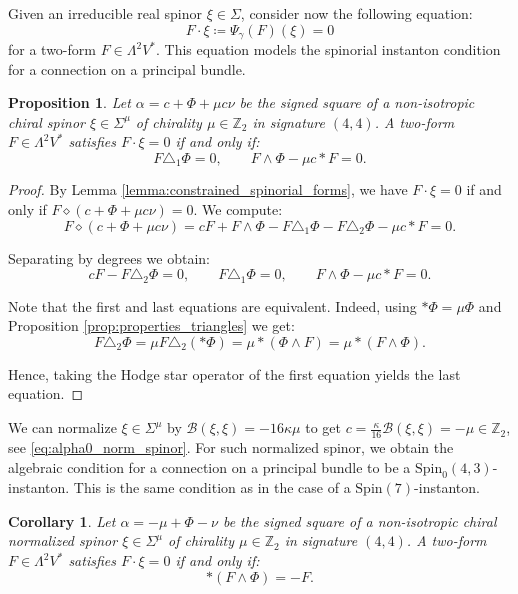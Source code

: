 \documentclass[10pt,reqno]{amsart}
\newtheorem{proposition}[theorem]{Proposition}
\newtheorem{corollary}[theorem]{Corollary}
\theoremstyle{definition}
\theoremstyle{remark}
\newcommand{\Z}{\mathbb{Z}}
\begin{document}
Given an irreducible real spinor $\xi\in\Sigma$, consider now the following equation: $$F\cdot\xi\coloneqq\Psi_\gamma(F)(\xi)=0$$ for a two-form $F\in\Lambda^2V^*$. This equation models the spinorial instanton condition for a connection on a principal bundle.

\begin{proposition}\label{prop:F.xi=0_Spin(4,3)}
    Let $\alpha=c+\Phi+\mu c\nu$ be the signed square of a non-isotropic chiral spinor $\xi\in\Sigma^\mu$ of chirality $\mu\in\Z_2$ in signature $(4,4)$. A two-form $F\in\Lambda^2V^*$ satisfies $F\cdot\xi=0$ if and only if: $$F\triangle_1\Phi=0,\qquad F\wedge\Phi-\mu c*F=0.$$
\end{proposition}

\begin{proof}
    By Lemma \ref{lemma:constrained_spinorial_forms}, we have $F\cdot\xi=0$ if and only if $F\diamond(c+\Phi+\mu c\nu)=0$. We compute: $$F\diamond(c+\Phi+\mu c\nu)=cF+F\wedge\Phi-F\triangle_1\Phi-F\triangle_2\Phi-\mu c*F=0.$$

    Separating by degrees we obtain: $$cF-F\triangle_2\Phi=0,\qquad F\triangle_1\Phi=0,\qquad F\wedge\Phi-\mu c*F=0.$$
    
    Note that the first and last equations are equivalent. Indeed, using $*\Phi=\mu\Phi$ and Proposition \ref{prop:properties_triangles} we get: $$F\triangle_2\Phi=\mu F\triangle_2(*\Phi)=\mu*(\Phi\wedge F)=\mu*(F\wedge\Phi).$$
    
    Hence, taking the Hodge star operator of the first equation yields the last equation.
\end{proof}

We can normalize $\xi\in\Sigma^\mu$ by $\mathscr{B}(\xi,\xi)=-16\kappa\mu$ to get $c=\frac{\kappa}{16}\mathscr{B}(\xi,\xi)=-\mu\in\Z_2$, see \eqref{eq:alpha0_norm_spinor}. For such normalized spinor, we obtain the algebraic condition for a connection on a principal bundle to be a $\mathrm{Spin}_0(4,3)$-instanton. This is the same condition as in the case of a $\mathrm{Spin}(7)$-instanton.

\begin{corollary}
    Let $\alpha=-\mu+\Phi-\nu$ be the signed square of a non-isotropic chiral normalized spinor $\xi\in\Sigma^\mu$ of chirality $\mu\in\Z_2$ in signature $(4,4)$. A two-form $F\in\Lambda^2V^*$ satisfies $F\cdot\xi=0$ if and only if: $$*(F\wedge\Phi)=-F.$$
\end{corollary}
\end{document}
